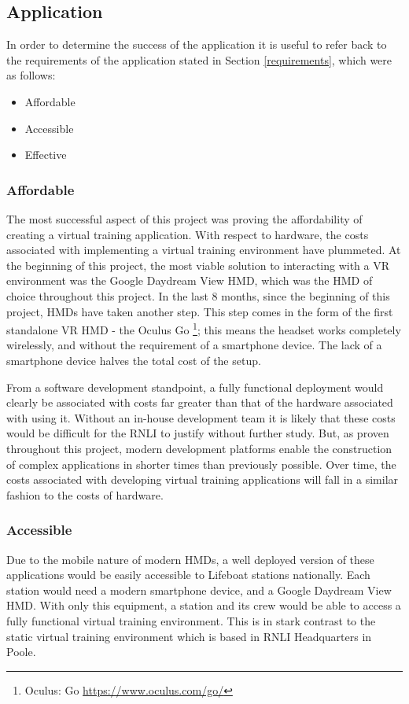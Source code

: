 \documentclass[ %
                    author={Elis Jones},
                supervisor={Dr. Kirsten Cater},
                    degree={BSc},
                     title={The Effect of Presentation Medium on Spatial Cognition},
                  subtitle={in the Virtual Environment},
                      year={2018} ]{dissertation}
\begin{document}
\subsection{Application}

In order to determine the success of the application it is useful to refer back to the requirements of the application stated in Section \ref{requirements}, which were as follows:

\begin{itemize}
    \item Affordable
    \item Accessible
    \item Effective
\end{itemize}

\subsubsection{Affordable}
The most successful aspect of this project was proving the affordability of creating a virtual training application. With respect to hardware, the costs associated with implementing a virtual training environment have plummeted. At the beginning of this project, the most viable solution to interacting with a VR environment was the Google Daydream View HMD, which was the HMD of choice throughout this project. In the last 8 months, since the beginning of this project, HMDs have taken another step. This step comes in the form of the first standalone VR HMD - the Oculus Go \footnote{Oculus: Go \url{https://www.oculus.com/go/}}; this means the headset works completely wirelessly, and without the requirement of a smartphone device. The lack of a smartphone device halves the total cost of the setup. 

From a software development standpoint, a fully functional deployment would clearly be associated with costs far greater than that of the hardware associated with using it. Without an in-house development team it is likely that these costs would be difficult for the RNLI to justify without further study. But, as proven throughout this project, modern development platforms enable the construction of complex applications in shorter times than previously possible. Over time, the costs associated with developing virtual training applications will fall in a similar fashion to the costs of hardware.

\subsubsection{Accessible}
Due to the mobile nature of modern HMDs, a well deployed version of these applications would be easily accessible to Lifeboat stations nationally. Each station would need a modern smartphone device, and a Google Daydream View HMD. With only this equipment, a station and its crew would be able to access a fully functional virtual training environment. This is in stark contrast to the static virtual training environment which is based in RNLI Headquarters in Poole. 
\end{document}
